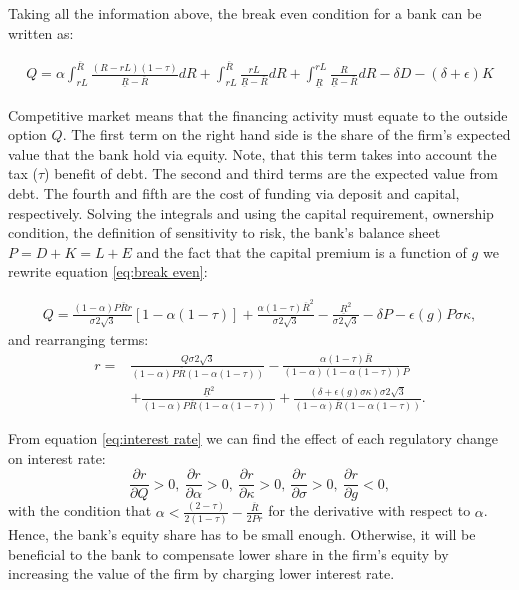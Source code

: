 \documentclass[12pt]{article}
\begin{document}
	Taking all the information above, the break even condition for a bank can be written as:  
	
		\begin{equation}
	\begin{aligned}
	Q=\alpha\int_{rL}^{\overline{R}}\frac{(R-rL)(1-\tau)}{\underline{R}-\overline{R}}dR+\int_{rL}^{\overline{R}}\frac{rL}{\underline{R}-\overline{R}}dR+\int_{\underline{R}}^{rL}\frac{R}{\underline{R}-\overline{R}}dR-\delta D-(\delta+\epsilon)K
	\end{aligned}
	\label{eq:break even}
	\end{equation}
	
	Competitive market means that the financing activity must equate to the outside option $Q$. The first term on the right hand side is the share of the firm's expected value that the bank hold via equity. Note, that this term takes into account the tax ($\tau$) benefit of debt. The second and third terms are the expected value from debt. The fourth and fifth are the cost of funding via deposit and capital, respectively. Solving the integrals and using the capital requirement, ownership condition, the definition of sensitivity to risk, the bank's balance sheet $P=D+K=L+E$ and the fact that the capital premium is a function of $g$ we rewrite equation \ref{eq:break even}:
		
			\begin{equation}
		\begin{aligned}
		Q=\frac{(1-\alpha)P\overline{R}r}{\sigma2\sqrt{3}}[1-\alpha(1-\tau)]+\frac{\alpha(1-\tau)\overline{R}^2}{\sigma2\sqrt{3}}-\frac{\underline{R}^2}{\sigma2\sqrt{3}}-\delta P-\epsilon(g)P\sigma\kappa,
		\end{aligned}
			\label{eq:break even solved}
		\end{equation} 
	and rearranging terms:
		\begin{equation}
	\begin{aligned}
	r=&\frac{Q\sigma2\sqrt{3}}{(1-\alpha)P\overline{R}(1-\alpha(1-\tau))}-\frac{\alpha(1-\tau)\overline{R}}{(1-\alpha)(1-\alpha(1-\tau))P}\\
	&+\frac{\underline{R}^2}{(1-\alpha)P\overline{R}(1-\alpha(1-\tau))}+\frac{(\delta+\epsilon(g)\sigma\kappa)\sigma2\sqrt{3}}{(1-\alpha)\overline{R}(1-\alpha(1-\tau))}.	\end{aligned}
		\label{eq:interest rate}
	\end{equation} 
	
	From equation \ref{eq:interest rate} we can find the effect of each regulatory change on interest rate: 
		\begin{equation}
	\frac{\partial r}{\partial Q}>0, \ \frac{\partial r}{\partial \alpha}>0, \
	\frac{\partial r}{\partial \kappa}>0, \
	\frac{\partial r}{\partial \sigma}>0, \
	\frac{\partial r}{\partial g}<0,
		\label{eq:derivatives}
	\end{equation}
	with the condition that $\alpha<\frac{(2-\tau)}{2(1-\tau)}-\frac{\overline{R}}{2Pr}$ for the derivative with respect to $\alpha$. Hence, the bank's equity share has to be small enough. Otherwise, it will be beneficial to the bank to compensate lower share in the firm's equity by increasing the value of the firm by charging lower interest rate. 
	       
\end{document}
